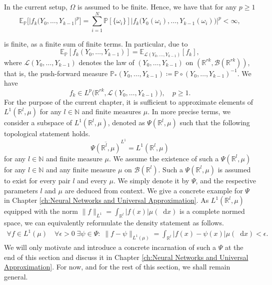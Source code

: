 \documentclass[11pt,a4paper,twoside,openany]{report}
\numberwithin{equation}{section}
\newcommand{\diff}{\mathop{}\!\mathrm{d}}
\theoremstyle{plain} %
\theoremstyle{definition} %
\theoremstyle{remark} %
\begin{document}
In the current setup, \(\Omega\) is assumed to be finite. Hence, we have that for any \(p\geq 1\)
\begin{equation*}
    \mathbb{E}_{\mathbb{P}}\big[|f_k(Y_0,\dots,Y_{k-1}|^p\big]=\sum_{i=1}^N \mathbb{P}[\{\omega_i\}]\big|f_k\big(Y_0(\omega_i),\dots,Y_{k-1}(\omega_i)\big)\big|^p<\infty,
\end{equation*}

is finite, as a finite sum of finite terms.
In particular, due to
\begin{equation*}
    \mathbb{E}_{\mathbb{P}}[f_k(Y_0,\dots,Y_{k-1})]=\mathbb{E}_{\mathcal{L}(Y_0,\dots,Y_{k-1})}[f_k],
\end{equation*}
where \(\mathcal{L}(Y_0,\dots,Y_{k-1})\) denotes the law of \((Y_0,\dots,Y_{k-1})\) on \((\mathbb{R}^{rk},\mathcal{B}(\mathbb{R}^{rk}))\), that is, the push-forward measure \(\mathbb{P}_*(Y_0,\dots,Y_{k-1})\coloneqq\mathbb{P}\circ(Y_0,\dots,Y_{k-1})^{-1}\). We have
\begin{equation}\label{eq:f is in Lp for finite setting}
    f_k\in L^p\big(\mathbb{R}^{rk},\mathcal{L}(Y_0,\dots,Y_{k-1})\big),\quad p\geq 1.
\end{equation}
For the purpose of the current chapter, it is sufficient to approximate elements of \(L^1(\mathbb{R}^{l},\mu)\) for any \(l\in\mathbb{N}\) and finite measures \(\mu\).  
In more precise terms, we consider a subspace of \(L^1(\mathbb{R}^l,\mu)\), denoted as \(\Psi(\mathbb{R}^l,\mu)\)  such that the following topological statement holds. 
\begin{equation*}
\overline{\Psi(\mathbb{R}^l,\mu)}^{L^1}=L^1(\mathbb{R}^{l},\mu)
\end{equation*}
for any \(l\in\mathbb{N}\) and finite measure \(\mu\). We assume the existence of such a \(\Psi(\mathbb{R}^l,\mu)\) for any \(l\in\mathbb{N}\) and any finite measure \(\mu\) on \(\mathcal{B}(\mathbb{R}^l)\). Such a \(\Psi(\mathbb{R}^l,\mu)\) is assumed to exist for every pair \(l\) and every \(\mu\). We simply denote it by \(\Psi\), and the respective parameters \(l\) and \(\mu\) are deduced from context.  We give a concrete example for \(\Psi\) in Chapter \ref{ch:Neural Networks and Universal Approximation}.
As \(L^1(\mathbb{R}^l,\mu)\) equipped with the norm \(\lVert f\lVert_{L^1}=\int_{\mathbb{R}^l}|f(x)| \mu(\diff x)\) is a complete normed space, we can equivalently reformulate the density statement as follows. 
\begin{align*}
\forall f\in L^1(\mu)\quad\forall \epsilon>0\;\exists \psi\in\Psi:\;\lVert f-\psi\rVert_{L^1(\mu)}=\int_{\mathbb{R}^{l}}|f(x)-\psi(x)| \mu(\diff x)<\epsilon.
\end{align*}
We will only motivate and introduce a concrete incarnation of such a \(\Psi\) at the end of this section and discuss it in Chapter \ref{ch:Neural Networks and Universal Approximation}. For now, and for the rest of this section, we shall remain general.
\end{document}
